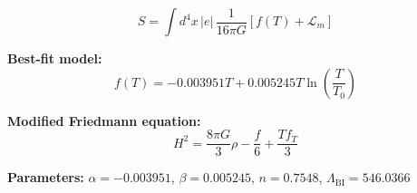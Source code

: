 
\begin{equation}
  S = \int d^4x \, |e| \, \frac{1}{16\pi G} \left[ f(T) + \mathcal{L}_m \right]
\end{equation}

\textbf{Best-fit model:}
\begin{equation}
  f(T) = -0.003951 T + 0.005245 T \ln\!\left(\frac{T}{T_0}\right)
\end{equation}

\textbf{Modified Friedmann equation:}
\begin{equation}
  H^2 = \frac{8\pi G}{3} \rho - \frac{f}{6} + \frac{T f_T}{3}
\end{equation}

\textbf{Parameters:}
$\alpha = -0.003951$, \quad
$\beta = 0.005245$, \quad
$n = 0.7548$, \quad
$\Lambda_{\text{BI}} = 546.0366$